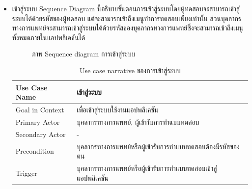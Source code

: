 \documentclass[12pt,oneside,openright,a4paper]{cpe-thai-project}
\begin{document}
\begin{itemize}
\begin{table}[!h]
\begin{tabular}{|p{4cm}|p{10cm}|}
      \end{tabular}
      \end{table}
      \newpage
    \item เข้าสู่ระบบ
    Sequence Diagram นี้อธิบายขั้นตอนการเข้าสู่ระบบโดยผู้ทดสอบจะสามารถเข้าสู่ระบบได้ด้วยรหัสของผู้ทดสอบ
    แต่จะสามารถเข้าถึงเมนูทำการทดสอบเพียงเท่านั้น 
    ส่วนบุคลากรทางการแพทย์จะสามารถเข้าสู่ระบบได้ด้วยรหัสของบุคลากรทางการแพทย์ซึ่งจะสามารถเข้าถึงเมนูทั้งหมดภายในแอปพลิเคชันได้
    \begin{figure}[!ht]\centering
      \setlength{\fboxrule}{0.2mm} %
      \setlength{\fboxsep}{1cm}
      \caption{ภาพ Sequence diagram การเข้าสู่ระบบ}\label{fig:activity4}
     \end{figure}
     \newpage
     \begin{table}[!h]\centering
      \caption{Use case narrative ของการเข้าสู่ระบบ}\label{tbl:application1}
      \begin{tabular}{|p{4cm}|p{10cm}|} \hline
      Use Case Name & เข้าสู่ระบบ \\ \hline
      Goal in Context & เพื่อเข้าสู่ระบบใช้งานแอปพลิเคชัน \\ \hline
      Primary Actor & บุคลากรทางการแพทย์, ผู้เข้ารับการทำแบบทดสอบ \\ \hline
      Secondary Actor & - \\ \hline
      Precondition & บุคลากรทางการแพทย์หรือผู้เข้ารับการทำแบบทดสอบต้องมีรหัสของตน \\ \hline
      Trigger & บุคลากรทางการแพทย์หรือผู้เข้ารับการทำแบบทดสอบเข้าสู่แอปพลิเคชัน \\ \hline

\end{tabular}
\end{table}
\end{itemize}
\end{document}
